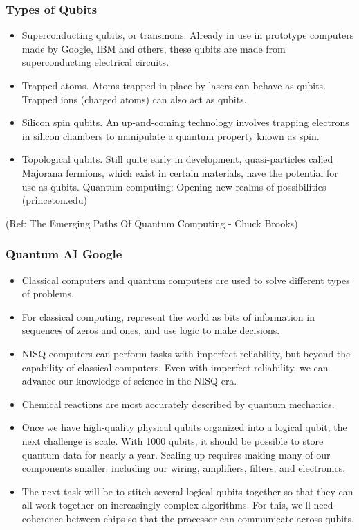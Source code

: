  \begin{frame}[fragile]\frametitle{Types of Qubits}
\begin{itemize}
\item  Superconducting qubits, or transmons. Already in use in prototype computers made by Google, IBM and others, these qubits are made from superconducting electrical circuits.
\item  Trapped atoms. Atoms trapped in place by lasers can behave as qubits. Trapped ions (charged atoms) can also act as qubits.
\item  Silicon spin qubits. An up-and-coming technology involves trapping electrons in silicon chambers to manipulate a quantum property known as spin.
\item  Topological qubits. Still quite early in development, quasi-particles called Majorana fermions, which exist in certain materials, have the potential for use as qubits. Quantum computing: Opening new realms of possibilities (princeton.edu)
\end{itemize}

	
\tiny{(Ref: The Emerging Paths Of Quantum Computing - Chuck Brooks)}

\end{frame}


\begin{frame}[fragile]\frametitle{Quantum AI Google}
\begin{itemize}
\item Classical computers and quantum computers are used to solve different types of problems. 
\item For classical computing, represent the world as bits of information in sequences of zeros and ones, and use logic to make decisions. 
\item NISQ computers can perform tasks with imperfect reliability, but beyond the capability of classical computers. Even with imperfect reliability, we can advance our knowledge of science in the NISQ era.
\item Chemical reactions are most accurately described by quantum mechanics.
\item Once we have high-quality physical qubits organized into a logical qubit, the next challenge is scale. With 1000 qubits, it should be possible to store quantum data for nearly a year. Scaling up requires making many of our components smaller: including our wiring, amplifiers, filters, and electronics.
\item The next task will be to stitch several logical qubits together so that they can all work together on increasingly complex algorithms. For this, we’ll need coherence between chips so that the processor can communicate across qubits. 
\end{itemize}
\end{frame}

